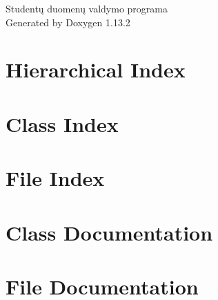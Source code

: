 \documentclass[twoside]{book}
\newcommand{\+}{\discretionary{\mbox{\scriptsize$\hookleftarrow$}}{}{}}
\newcommand{\clearemptydoublepage}{%
    \newpage{\pagestyle{empty}\cleardoublepage}%
  }
\begin{document}
  \raggedbottom
    \hypersetup{pageanchor=false,
                bookmarksnumbered=true,
                pdfencoding=unicode
               }
  \begin{titlepage}
  \vspace*{7cm}
  \begin{center}%
  {\Large Studentų duomenų valdymo programa}\\
  \vspace*{1cm}
  {\large Generated by Doxygen 1.13.2}\\
  \end{center}
  \end{titlepage}
  \clearemptydoublepage
  \tableofcontents
  \clearemptydoublepage
  \hypersetup{pageanchor=true}
\chapter{Hierarchical Index}

\chapter{Class Index}

\chapter{File Index}

\chapter{Class Documentation}



\chapter{File Documentation}













  \backmatter
  \newpage
  \clearemptydoublepage
  \printindex
\end{document}
